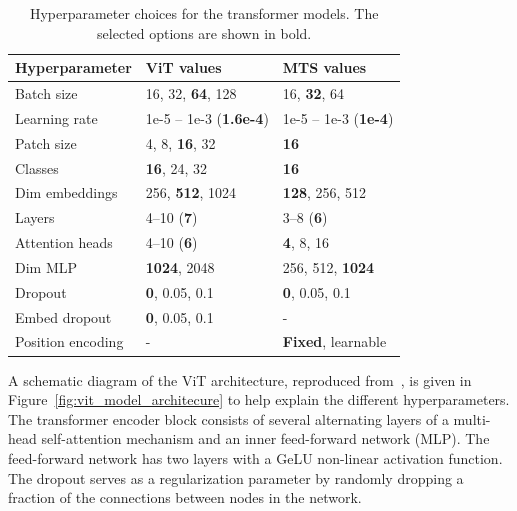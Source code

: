 \begin{table}[htb]
    \centering
    \caption{Hyperparameter choices for the transformer models. The selected options are shown in bold.}
    \label{tab:transformer_hyperparams}
    \begin{tabular}{lll}
    \toprule
    \textbf{Hyperparameter} & \textbf{ViT values} & \textbf{MTS values} \\ 
    \midrule
    Batch size           & 16, 32, \textbf{64}, 128 & 16, \textbf{32}, 64 \\
    Learning rate        & 1e-5 -- 1e-3 (\textbf{1.6e-4}) & 1e-5 -- 1e-3 (\textbf{1e-4}) \\
    Patch size           & 4, 8, \textbf{16}, 32 & \textbf{16} \\
    Classes              & \textbf{16}, 24, 32 & \textbf{16} \\
    Dim embeddings       & 256, \textbf{512}, 1024 & \textbf{128}, 256, 512 \\
    Layers               & 4--10 (\textbf{7}) & 3--8 (\textbf{6}) \\
    Attention heads      & 4--10 (\textbf{6}) & \textbf{4}, 8, 16 \\
    Dim MLP              & \textbf{1024}, 2048 & 256, 512, \textbf{1024} \\
    Dropout              & \textbf{0}, 0.05, 0.1 & \textbf{0}, 0.05, 0.1 \\
    Embed dropout        & \textbf{0}, 0.05, 0.1 & - \\
    Position encoding    & - & \textbf{Fixed}, learnable \\
    \bottomrule
    \end{tabular}
    \myvspacecommand
\end{table}

A schematic diagram of the ViT architecture, reproduced from~\cite{Vaswani_2017_transformer}, is given in Figure~\ref{fig:vit_model_architecure} to help explain the different hyperparameters. The transformer encoder block consists of several alternating layers of a multi-head self-attention mechanism and an inner feed-forward network (MLP). The feed-forward network has two layers with a GeLU non-linear activation function. The dropout serves as a regularization parameter by randomly dropping a fraction of the connections between nodes in the network.


